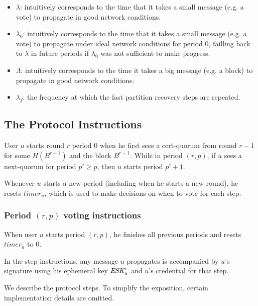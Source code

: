 \documentclass[../main.tex]{subfiles}
\begin{document}
\begin{itemize}

\item $\lambda$: intuitively corresponds to the time that it takes a small message (e.g. a vote) to propagate in good network conditions.

\item $\lambda_0$: intuitively corresponds to the time that it takes a small message (e.g. a vote) to propagate under ideal network conditions for period $0$, failling back to $\lambda$ in future periods if $\lambda_0$ was not sufficient to make progress.

\item $\Lambda$: intuitively corresponds to the time it takes a big message (e.g. a block) to propagate in good network conditions.

\item $\lambda_f$: the frequency at which the fast partition recovery steps are repeated.

\end{itemize}

\subsection{The Protocol Instructions}
User $u$ starts round $r$ period $0$ when he first sees a cert-quorum from round $r-1$ for some $H(B^{r-1})$ and the block $B^{r-1}$. 
While in period $(r,p)$, if $u$ sees a next-quorum for period $p' \geq p$, then $u$ starts period $p'+1$.

Whenever $u$ starts a new period (including when he starts a new round), he resets $timer_u$, which is used to make decisions on when to vote for each step.

\subsubsection{Period $(r,p)$ voting instructions}

When user $u$ starts period $(r,p)$, he finishes all previous periods and resets $timer_u$ to $0$.

In the step instructions, any message $u$ propagates is accompanied by $u$'s signature using his ephemeral key $\textit{ESK}^r_u$ and
$u$'s credential for that step.

We describe the protocol steps. To simplify the exposition, certain implementation details are omitted.
\end{document}
